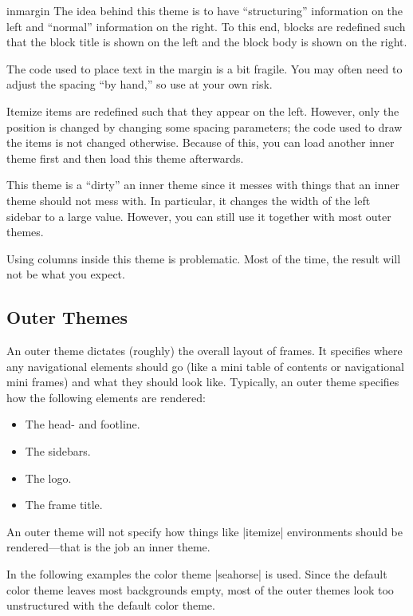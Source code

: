 \begin{innerthemeexample}{inmargin}
  The idea behind this theme is to have ``structuring'' information on
  the left and ``normal'' information on the right. To this end,
  blocks are redefined such that the block title is shown on the left
  and the block body is shown on the right.

  The code used to place text in the margin is a bit fragile. You may
  often need to adjust the spacing ``by hand,'' so use at your own risk.

  Itemize items are redefined such that they appear on the
  left. However, only the position is changed by changing some spacing
  parameters; the code used to draw the items is not changed
  otherwise. Because of this, you can load another inner theme first
  and then load this theme afterwards. 
  
  This theme is a ``dirty'' an inner theme since it messes with things
  that an inner theme should not mess with. In particular, it changes
  the width of the left sidebar to a large value. However, you can
  still use it together with most outer themes.

  Using columns inside this theme is problematic. Most of the time,
  the result will not be what you expect.
\end{innerthemeexample}




\subsection{Outer Themes}

An outer theme dictates (roughly) the overall layout of frames. It
specifies where any navigational elements should go (like a mini table
of contents or navigational mini frames) and what they should look
like. Typically, an outer theme specifies how the following elements
are rendered: 
\begin{itemize}
\item The head- and footline.
\item The sidebars.
\item The logo.
\item The frame title.  
\end{itemize}

An outer theme will not specify how things like |itemize| environments
should be rendered---that is the job an inner theme.

In the following examples the color theme |seahorse| is
used. Since the default color theme leaves most backgrounds empty,
most of the outer themes look too unstructured with the default
color theme. 



